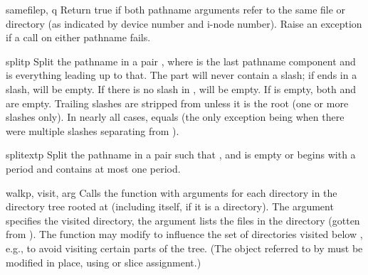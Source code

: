 \begin{funcdesc}{samefile}{p, q}
Return true if both pathname arguments refer to the same file or
directory (as indicated by device number and i-node number).
Raise an exception if a  call on either pathname
fails.
\end{funcdesc}

\begin{funcdesc}{split}{p}
Split the pathname  in a pair ,
where  is the last pathname component and  is
everything leading up to that.  The  part will never contain
a slash; if  ends in a slash,  will be empty.  If
there is no slash in ,  will be empty.  If  is
empty, both  and  are empty.  Trailing slashes are
stripped from  unless it is the root (one or more slashes
only).  In nearly all cases, 
equals  (the only exception being when there were multiple
slashes separating  from ).
\end{funcdesc}

\begin{funcdesc}{splitext}{p}
Split the pathname  in a pair 
such that ,
and  is empty or begins with a period and contains
at most one period.
\end{funcdesc}

\begin{funcdesc}{walk}{p, visit, arg}
Calls the function  with arguments
 for each directory in the
directory tree rooted at  (including  itself, if it is a
directory).  The argument  specifies the visited directory,
the argument  lists the files in the directory (gotten from
).
The  function may modify  to
influence the set of directories visited below , e.g., to
avoid visiting certain parts of the tree.  (The object referred to by
 must be modified in place, using  or slice
assignment.)
\end{funcdesc}
